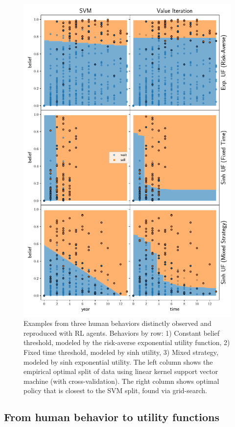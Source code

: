 \begin{figure}[h]
    \centering
    \includegraphics[width=0.99\linewidth]{img/fit}
    \caption{Examples from three human behaviors distinctly observed and reproduced with RL agents. Behaviors by row: 1) Constant belief threshold, modeled by the risk-averse exponential utility function, 2) Fixed time threshold, modeled by sinh utility, 3) Mixed strategy, modeled by sinh exponential utility. The left column shows the empirical optimal split of data using linear kernel support vector machine (with cross-validation). The right column shows optimal policy that is closest to the SVM split, found via grid-search.}
    \label{fig:svm_vs_value}
\end{figure}

\subsection{From human behavior to utility functions}\label{ssec:human-behavior}

